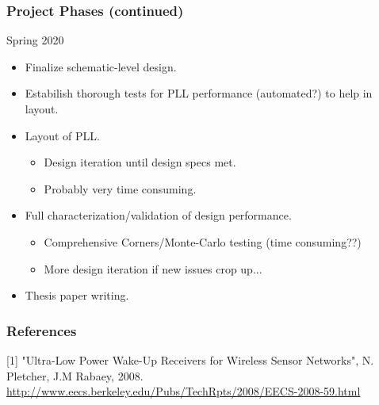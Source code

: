 \documentclass[t, screen, aspectratio=43]{beamer}
\begin{document}
\begin{frame}
	\frametitle{Project Phases (continued)}
	\begin{block}{Spring 2020}
		\begin{itemize}
			\footnotesize
			\item Finalize schematic-level design.
			\item Estabilish thorough tests for PLL performance (automated?) to help in layout.
			\item Layout of PLL.
			\begin{itemize}
				\footnotesize
				\item Design iteration until design specs met.
				\item Probably very time consuming.
			\end{itemize}
			\item Full characterization/validation of design performance. 
			\begin{itemize}
				\footnotesize
				\item Comprehensive Corners/Monte-Carlo testing (time consuming??)
				\item More design iteration if new issues crop up...
			\end{itemize}
			\item Thesis paper writing.
		\end{itemize}
	\end{block}
\end{frame}



\begin{frame}
	\frametitle{References}
		\scriptsize
		[1] "Ultra-Low Power Wake-Up Receivers for Wireless Sensor Networks", N. Pletcher, J.M Rabaey, 2008.\\
		\hspace{16pt}\url{http://www.eecs.berkeley.edu/Pubs/TechRpts/2008/EECS-2008-59.html}\\
		\vspace{1em}
\end{frame}
\end{document}
